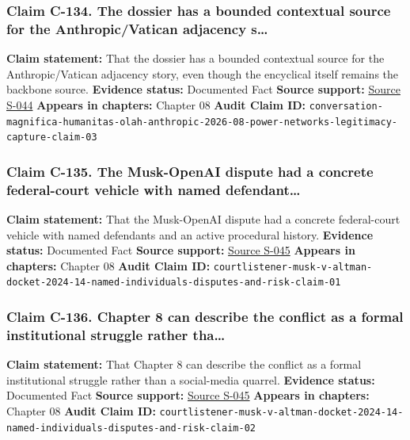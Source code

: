 \documentclass[
  american,
  11pt,
  letterpaper,
]{article}
\begin{document}
\subsubsection{Claim C-134. The dossier has a bounded contextual source
for the Anthropic/Vatican adjacency
s\ldots{}}\label{claim-c-134-the-dossier-has-a-bounded-contextual-source-for-the-anthropic-vatican-adjacency-s}

\textbf{Claim statement:} That the dossier has a bounded contextual
source for the Anthropic/Vatican adjacency story, even though the
encyclical itself remains the backbone source. \textbf{Evidence status:}
Documented Fact \textbf{Source support:}
\hyperref[source-s-044-magnifica-humanitas-el-papel-de-christopher-olah-y-anthropic-en-la-enc-clica-sobre-la-ia-del-papa-le-n-xiv]{Source
S-044} \textbf{Appears in chapters:} Chapter 08 \textbf{Audit Claim ID:}
\texttt{conversation-magnifica-humanitas-olah-anthropic-2026-08-power-networks-legitimacy-capture-claim-03}

\subsubsection{Claim C-135. The Musk-OpenAI dispute had a concrete
federal-court vehicle with named
defendant\ldots{}}\label{claim-c-135-the-musk-openai-dispute-had-a-concrete-federal-court-vehicle-with-named-defendant}

\textbf{Claim statement:} That the Musk-OpenAI dispute had a concrete
federal-court vehicle with named defendants and an active procedural
history. \textbf{Evidence status:} Documented Fact \textbf{Source
support:} \hyperref[source-s-045-musk-v-altman-4-24-cv-04722]{Source
S-045} \textbf{Appears in chapters:} Chapter 08 \textbf{Audit Claim ID:}
\texttt{courtlistener-musk-v-altman-docket-2024-14-named-individuals-disputes-and-risk-claim-01}

\subsubsection{Claim C-136. Chapter 8 can describe the conflict as a
formal institutional struggle rather
tha\ldots{}}\label{claim-c-136-chapter-8-can-describe-the-conflict-as-a-formal-institutional-struggle-rather-tha}

\textbf{Claim statement:} That Chapter 8 can describe the conflict as a
formal institutional struggle rather than a social-media quarrel.
\textbf{Evidence status:} Documented Fact \textbf{Source support:}
\hyperref[source-s-045-musk-v-altman-4-24-cv-04722]{Source S-045}
\textbf{Appears in chapters:} Chapter 08 \textbf{Audit Claim ID:}
\texttt{courtlistener-musk-v-altman-docket-2024-14-named-individuals-disputes-and-risk-claim-02}
\end{document}
